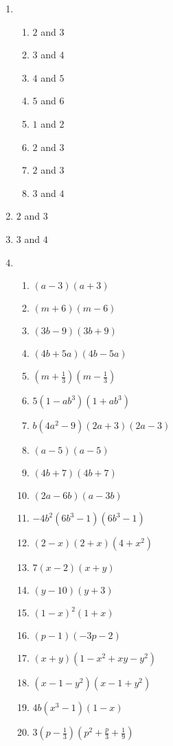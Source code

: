{\begin{multicols}{3}
\begin{enumerate}[noitemsep, label=\textbf{\arabic*}. ]
\item %

    \begin{enumerate}[noitemsep, label=\textbf{(\alph*)} ] 
\item $2$ and $3$
\item $3$ and $4$
\item $4$ and $5$
\item $5$ and $6$
\item $1$ and $2$
\item $2$ and $3$
\item $2$ and $3$
\item $3$ and $4$
    \end{enumerate}


\item $2$ and $3$%
\item $3$ and $4$%

\item %

\begin{enumerate}[noitemsep, label=\textbf{(\alph*)} ] 
\item $(a - 3)(a + 3)$%
\item $(m + 6)(m - 6)$%
\item $(3b - 9)(3b + 9)$%
\item $(4b + 5a)(4b - 5a)$%
\item $(m +\frac{1}{3})(m -\frac{1}{3})$%
\item $5(1 - ab^3)(1 + ab^3)$%
\item $b(4a^2 - 9)(2a + 3)(2a - 3)$%
\item $(a - 5)(a - 5)$%
\item $(4b + 7)(4b + 7)$%
\item $(2a - 6b)(a - 3b)$%
\item $-4b^2(6b^3 - 1)(6b^3 - 1)$%
\item $(2 - x)(2 + x)(4 + x^2)$%
\item $7(x - 2)(x + y)$%
\item $(y - 10)(y + 3)$%
\item $(1 - x)^{2}(1 +x)$%
\item $(p - 1)(-3p-2)$%
\item $(x+y)(1-x^2+xy-y^2)$
\item $(x-1-y^2)(x-1+y^2)$
\item $4b(x^3-1)(1-x)$
\item $3(p-\frac{1}{3})(p^2+\frac{p}{3}+\frac{1}{9})$
\end{enumerate}



\end{enumerate}
\end{multicols}}
